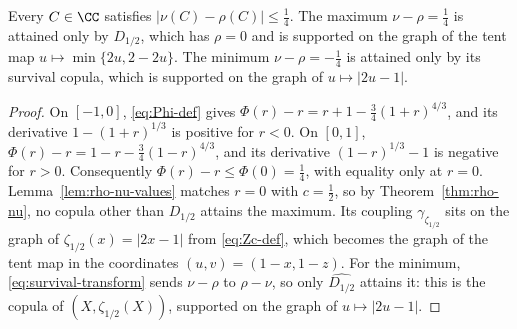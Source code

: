 \begin{corollary}
\label{cor:nu-rho}
Every $C\in\CC$ satisfies $|\nu(C)-\rho(C)|\le\frac14$.
The maximum $\nu-\rho=\frac14$ is attained only by $D_{1/2}$, which has $\rho=0$ and is supported on the graph of the tent map $u\mapsto\min\{2u,2-2u\}$.
The minimum $\nu-\rho=-\frac14$ is attained only by its survival copula, which is supported on the graph of $u\mapsto|2u-1|$.
\end{corollary}

\begin{proof}
On $[-1,0]$, \eqref{eq:Phi-def} gives $\Phi(r)-r=r+1-\frac34(1+r)^{4/3}$, and its derivative $1-(1+r)^{1/3}$ is positive for $r<0$.
On $[0,1]$, $\Phi(r)-r=1-r-\frac34(1-r)^{4/3}$, and its derivative $(1-r)^{1/3}-1$ is negative for $r>0$.
Consequently $\Phi(r)-r\le\Phi(0)=\frac14$, with equality only at $r=0$.
Lemma~\ref{lem:rho-nu-values} matches $r=0$ with $c=\frac12$, so by Theorem~\ref{thm:rho-nu}, no copula other than $D_{1/2}$ attains the maximum.
Its coupling $\gamma_{\zeta_{1/2}}$ sits on the graph of $\zeta_{1/2}(x)=|2x-1|$ from \eqref{eq:Zc-def}, which becomes the graph of the tent map in the coordinates $(u,v)=(1-x,1-z)$.
For the minimum, \eqref{eq:survival-transform} sends $\nu-\rho$ to $\rho-\nu$, so only $\widehat{D_{1/2}}$ attains it: this is the copula of $(X,\zeta_{1/2}(X))$, supported on the graph of $u\mapsto|2u-1|$.
\end{proof}
